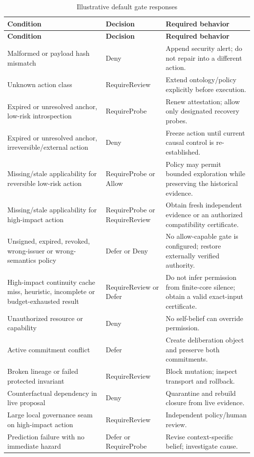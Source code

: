 \documentclass[11pt,oneside]{report}
\begin{document}
\begin{longtable}{@{}L{2.00in}L{1.00in}L{3.45in}@{}}
\caption{Illustrative default gate responses}\label{tab:gate-matrix}\\
\toprule
\textbf{Condition} & \textbf{Decision} & \textbf{Required behavior} \\
\midrule
\endfirsthead
\toprule
\textbf{Condition} & \textbf{Decision} & \textbf{Required behavior} \\
\midrule
\endhead
Malformed or payload hash mismatch & Deny & Append security alert; do not repair into a different action. \\
Unknown action class & RequireReview & Extend ontology/policy explicitly before execution. \\
Expired or unresolved anchor, low-risk introspection & RequireProbe & Renew attestation; allow only designated recovery probes. \\
Expired or unresolved anchor, irreversible/external action & Deny & Freeze action until current causal control is re-established. \\
Missing/stale applicability for reversible low-risk action & RequireProbe or Allow & Policy may permit bounded exploration while preserving the historical evidence. \\
Missing/stale applicability for high-impact action & RequireProbe or RequireReview & Obtain fresh independent evidence or an authorized compatibility certificate. \\
Unsigned, expired, revoked, wrong-issuer or wrong-semantics policy & Defer or Deny & No allow-capable gate is configured; restore externally verified authority. \\
High-impact continuity cache miss, heuristic, incomplete or budget-exhausted result & RequireReview or Defer & Do not infer permission from finite-core silence; obtain a valid exact-input certificate. \\
Unauthorized resource or capability & Deny & No self-belief can override permission. \\
Active commitment conflict & Defer & Create deliberation object and preserve both commitments. \\
Broken lineage or failed protected invariant & RequireReview & Block mutation; inspect transport and rollback. \\
Counterfactual dependency in live proposal & Deny & Quarantine and rebuild closure from live evidence. \\
Large local governance seam on high-impact action & RequireReview & Independent policy/human review. \\
Prediction failure with no immediate hazard & Defer or RequireProbe & Revise context-specific belief; investigate cause. \\
\bottomrule
\end{longtable}
\end{document}
